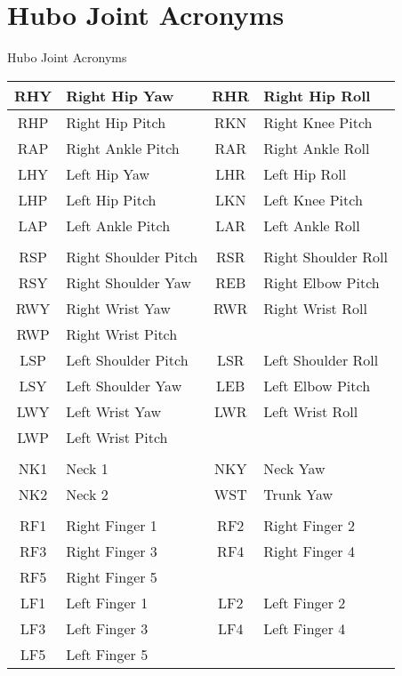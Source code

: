 \chapter{Hubo Joint Acronyms}
\Large
\begin{center}
Hubo Joint Acronyms\\
\normalsize
\begin{longtable}{c | l || c | l}
\hline
		RHY				&	Right Hip Yaw     & RHR				&	Right Hip Roll \\
		\hline
		RHP				&	Right Hip Pitch   & RKN				&	Right Knee Pitch\\
		\hline
		RAP				&	Right Ankle Pitch & RAR				&	Right Ankle Roll\\
\hline

\hline
		LHY				&	Left Hip Yaw      & LHR				&	Left Hip Roll\\
		\hline
		LHP				&	Left Hip Pitch    & LKN				&	Left Knee Pitch\\
		\hline
		LAP				&	Left Ankle Pitch  & LAR				&	Left Ankle Roll\\
\hline
& & & \\
\hline
		RSP				&	Right Shoulder Pitch & RSR			&	Right Shoulder Roll\\
		\hline
		RSY				&	Right Shoulder Yaw   & REB			&	Right Elbow Pitch\\
		\hline
		RWY				&   Right Wrist Yaw      & RWR			&   Right Wrist Roll\\
		\hline
		RWP				&   Right Wrist Pitch    & & \\
\hline

\hline
		LSP				&	Left Shoulder Pitch  & LSR		    &	Left Shoulder Roll\\
		\hline
		LSY				&	Left Shoulder Yaw    & LEB			&	Left Elbow Pitch\\
		\hline
		LWY				&   Left Wrist Yaw       & LWR			&   Left Wrist Roll\\
		\hline
		LWP				&   Left Wrist Pitch	 & & \\
\hline
& & & \\
\hline
		NK1				& Neck 1    & NKY				& Neck Yaw\\
		\hline
	    NK2				& Neck 2    & WST				& Trunk Yaw \\
\hline

		  & & \\
\hline
		RF1				&	Right Finger 1 & RF2				&	Right Finger 2\\
		\hline
		RF3				&	Right Finger 3 & RF4				&	Right Finger 4\\
		\hline
		RF5				&	Right Finger 5 & & \\
\hline

\hline
		LF1				&	Left Finger 1 & LF2				&	Left Finger 2\\
		\hline
		LF3				&	Left Finger 3 & LF4				&	Left Finger 4\\
		\hline
		LF5				&	Left Finger 5 & & \\
		
\end{longtable}
\end{center}